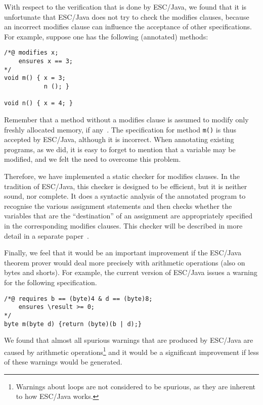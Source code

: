 \documentclass[a4paper]{llncs}
\begin{document}
With respect to the verification that is done by ESC/Java, we found
that it is unfortunate that ESC/Java does not try to check the modifies
clauses, because an incorrect modifies clause can influence the
acceptance of other specifications. For example, suppose one has the
following (annotated) methods$:$
\begin{verbatim}
/*@ modifies x;
    ensures x == 3;
*/
void m() { x = 3;
           n (); }

void n() { x = 4; }
\end{verbatim}
Remember that a method without a modifies clause is assumed to modify
only freshly allocated memory, if any~\cite{LeinoNS00}. The
specification for method \texttt{m()} is thus accepted by ESC/Java,
although it is incorrect. When annotating existing programs, as we
did, it is easy to forget to mention that a variable may be modified,
and we felt the need to overcome this problem.

Therefore, we have implemented a static checker for modifies
clauses. In the tradition of ESC/Java, this checker is designed to be
efficient, but it is neither sound, nor complete. It does a syntactic
analysis of the annotated program to recognise the various assignment
statements and then checks whether the variables that are the
``destination'' of an assignment are appropriately specified in the
corresponding modifies clauses. This checker will be described in more
detail in a separate paper~\cite{CatanoH02b}.

Finally, we feel that it would be an important improvement if the
ESC/Java theorem prover would deal more precisely with arithmetic
operations (also on bytes and shorts). For example, the current
version of ESC/Java issues a warning for the following specification.
\begin{verbatim}
/*@ requires b == (byte)4 & d == (byte)8;
    ensures \result >= 0;
*/
byte m(byte d) {return (byte)(b | d);}
\end{verbatim}
We found that almost all spurious warnings that are produced by
ESC/Java are caused by arithmetic operations\footnote{Warnings about
loops are not considered to be spurious, as they are inherent to how
ESC/Java works.} and it would be a significant improvement if less of
these warnings would be generated.

\end{document}
